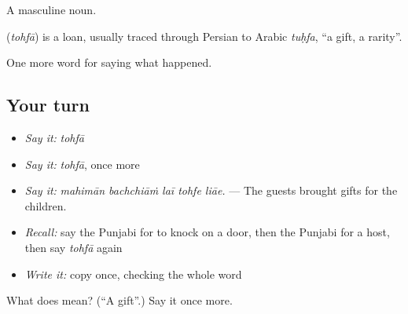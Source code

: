 A masculine noun.

\begin{cousinweb}
\textbf{} (\emph{tohfā}) is a loan, usually traced through Persian to Arabic \emph{tuḥfa}, \textquotedblleft{}a gift, a rarity\textquotedblright{}.
\end{cousinweb}

\begin{grammarlens}[title={What you've built}]
One more word for saying what happened.
\end{grammarlens}

\subsection*{Your turn}
\begin{itemize}
\raggedright
  \item \emph{Say it:} \emph{tohfā}
  \item \emph{Say it:} \emph{tohfā}, once more
  \item \emph{Say it:} \emph{mahimān bachchiāṁ laī tohfe liāe.} — The guests brought gifts for the children.
  \item \emph{Recall:} say the Punjabi for to knock on a door, then the Punjabi for a host, then say \emph{tohfā} again
  \item \emph{Write it:} copy \textbf{} once, checking the whole word
\end{itemize}

\begin{tcolorbox}[breakable,colback=teal!4,colframe=teal!35!black,title={Before you move on}]
What does  mean? (\textquotedblleft{}A gift\textquotedblright{}.) Say it once more.
\end{tcolorbox}
